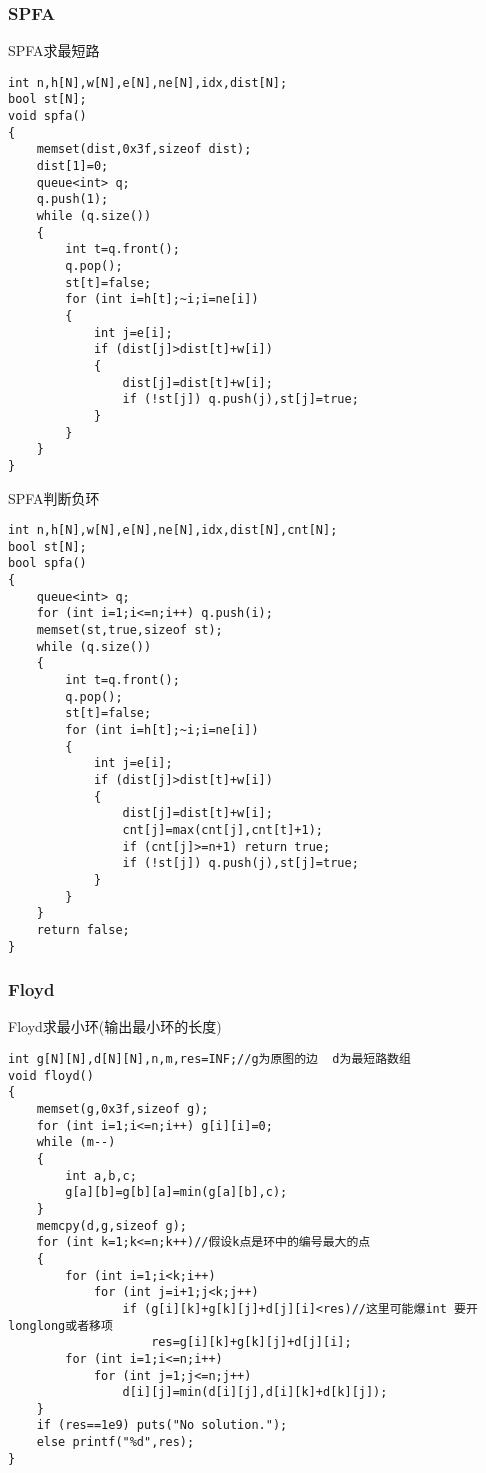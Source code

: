 \documentclass[a4paper]{ctexart}
\begin{document}
\subsubsection{SPFA}

SPFA求最短路

\begin{lstlisting}
int n,h[N],w[N],e[N],ne[N],idx,dist[N];
bool st[N];
void spfa()
{
    memset(dist,0x3f,sizeof dist);
    dist[1]=0;
    queue<int> q;
    q.push(1);
    while (q.size())
    {
        int t=q.front();
        q.pop();
        st[t]=false;
        for (int i=h[t];~i;i=ne[i])
        {
            int j=e[i];
            if (dist[j]>dist[t]+w[i])
            {
                dist[j]=dist[t]+w[i];
                if (!st[j]) q.push(j),st[j]=true;
            }
        }
    }
}
\end{lstlisting}

SPFA判断负环

\begin{lstlisting}
int n,h[N],w[N],e[N],ne[N],idx,dist[N],cnt[N];
bool st[N];
bool spfa()
{
    queue<int> q;
    for (int i=1;i<=n;i++) q.push(i);
    memset(st,true,sizeof st);
    while (q.size())
    {
        int t=q.front();
        q.pop();
        st[t]=false;
        for (int i=h[t];~i;i=ne[i])
        {
            int j=e[i];
            if (dist[j]>dist[t]+w[i])
            {
                dist[j]=dist[t]+w[i];
                cnt[j]=max(cnt[j],cnt[t]+1);
                if (cnt[j]>=n+1) return true;
                if (!st[j]) q.push(j),st[j]=true;
            }
        }
    }
    return false;
}
\end{lstlisting}

\subsubsection{Floyd}

Floyd求最小环(输出最小环的长度)

\begin{lstlisting}
int g[N][N],d[N][N],n,m,res=INF;//g为原图的边  d为最短路数组
void floyd()
{
	memset(g,0x3f,sizeof g);
	for (int i=1;i<=n;i++) g[i][i]=0;
	while (m--)
	{
		int a,b,c;
		g[a][b]=g[b][a]=min(g[a][b],c);
	}
	memcpy(d,g,sizeof g);
	for (int k=1;k<=n;k++)//假设k点是环中的编号最大的点
	{
		for (int i=1;i<k;i++)
			for (int j=i+1;j<k;j++)
				if (g[i][k]+g[k][j]+d[j][i]<res)//这里可能爆int 要开longlong或者移项
					res=g[i][k]+g[k][j]+d[j][i];
		for (int i=1;i<=n;i++)
			for (int j=1;j<=n;j++)
				d[i][j]=min(d[i][j],d[i][k]+d[k][j]);
	}
	if (res==1e9) puts("No solution.");
	else printf("%d",res);
}
\end{lstlisting}
\end{document}
